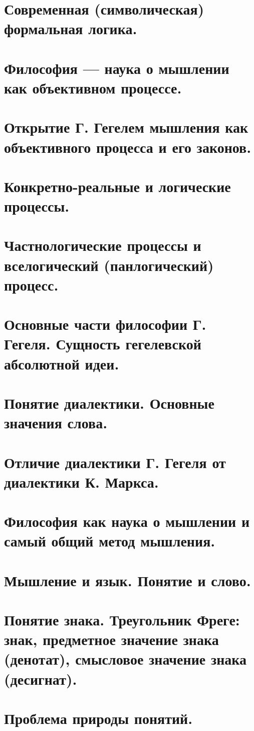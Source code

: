 \section{ Современная (символическая) формальная логика.}
\section{ Философия — наука о мышлении как объективном процессе.}
\section{ Открытие Г. Гегелем мышления как объективного процесса и его законов.}
\section{ Конкретно-реальные и логические процессы.}
\section{ Частнологические процессы и вселогический (панлогический) процесс.}
\section{ Основные части философии Г. Гегеля. Сущность гегелевской абсолютной идеи.}
\section{ Понятие диалектики. Основные значения слова.}
\section{ Отличие диалектики Г. Гегеля от диалектики К. Маркса.}
\section{ Философия как наука о мышлении и самый общий метод мышления.}
\section{ Мышление и язык. Понятие и слово.}
\section{ Понятие знака. Треугольник Фреге: знак, предметное значение знака (денотат), смысловое значение знака (десигнат).}
\section{ Проблема природы понятий.}
